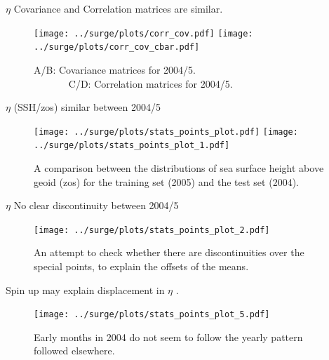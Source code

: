   \begin{frame}{$\eta$ Covariance and Correlation matrices are similar. }
\vspace{-20pt}
\begin{figure}[htb!]
    \centering
    \hspace{-10pt}
    \texttt{[image: ../surge/plots/corr\_cov.pdf]}
            \texttt{[image: ../surge/plots/corr\_cov\_cbar.pdf]}
    \vspace{-7pt}
    \caption{A/B: Covariance matrices for 2004/5.\\
             $\quad\quad\quad\;\;$C/D: Correlation matrices for 2004/5.}
    \label{fig:}
\end{figure}
\end{frame}

\begin{frame}{ $\eta$ (SSH/zos) similar between 2004/5 }
\vspace{-20pt}
\begin{figure}[htb!]
    \centering
    \texttt{[image: ../surge/plots/stats\_points\_plot.pdf]}
       \hspace{0pt} \texttt{[image: ../surge/plots/stats\_points\_plot\_1.pdf]}
    \vspace{-7pt}
    \caption{A comparison between the distributions of sea surface height
     above geoid (zos) for the training set (2005) and the test set (2004).}
\end{figure}
\end{frame}

\begin{frame}{$\eta$ No clear discontinuity between 2004/5  }
\vspace{-20pt}
\begin{figure}[htb!]
    \centering
    \texttt{[image: ../surge/plots/stats\_points\_plot\_2.pdf]}
    \vspace{-7pt}
    \caption{An attempt to check whether there are discontinuities
     over the special points, to explain the offsets of the means.}
\end{figure}
\end{frame}

\begin{frame}{Spin up may explain displacement in $\eta$ . }
\vspace{-20pt}
\begin{figure}[htb!]
    \centering
    \texttt{[image: ../surge/plots/stats\_points\_plot\_5.pdf]}
    \vspace{-7pt}
    \caption{Early months in 2004 do not seem
             to follow the yearly pattern followed elsewhere.}
\end{figure}
\end{frame}


